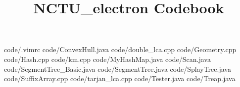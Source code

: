 \documentclass {article}
\begin{document}
\title {NCTU_electron Codebook}
 {code/.vimrc}
 {code/ConvexHull.java}
 {code/double_lca.cpp}
 {code/Geometry.cpp}
 {code/Hash.cpp}
 {code/km.cpp}
 {code/MyHashMap.java}
 {code/Scan.java}
 {code/SegmentTree_Basic.java}
 {code/SegmentTree.java}
 {code/SplayTree.java}
 {code/SuffixArray.cpp}
 {code/tarjan_lca.cpp}
 {code/Tester.java}
 {code/Treap.java}
\end{document}

